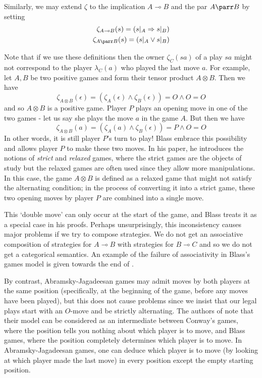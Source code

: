 \documentclass[11pt]{article} %
\theoremstyle{plain} %
\theoremstyle{definition} %
\theoremstyle{exercisestyle}
\newcommand{\tensor}{\otimes}
\renewcommand{\implies}{\multimap}
\newcommand{\emptyplay}{\epsilon}
\begin{document}
Similarly, we may extend $\zeta$ to the implication $A\implies B$ and the par $A\parr B$ by setting
\begin{align*}
  \zeta_{A\implies B}(s)=(s\vert_A\Rightarrow s\vert_B)\\
  \zeta_{A\parr B}(s) = (s\vert_A \vee s\vert_B)
\end{align*}

Note that if we use these definitions then the owner $\zeta_C(sa)$ of a play $sa$ might not correspond to the player $\lambda_C(a)$ who played the last move $a$.  For example, let $A,B$ be two positive games and form their tensor product $A\tensor B$.  Then we have
\[
  \zeta_{A\tensor B}(\emptyplay) = (\zeta_A(\emptyplay) \wedge \zeta_B(\emptyplay)) = O \wedge O = O
  \]
and so $A\tensor B$ is a positive game.  Player $P$ plays an opening move in one of the two games - let us say she plays the move $a$ in the game $A$.  But then we have
\[
  \zeta_{A\tensor B}(a) = (\zeta_A(a) \wedge \zeta_B(\emptyplay)) = P \wedge O = O
  \]
In other words, it is still player $P$'s turn to play!  Blass embrace this possibility and allows player $P$ to make these two moves.  In his paper, he introduces the notions of \emph{strict} and \emph{relaxed} games, where the strict games are the objects of study but the relaxed games are often used since they allow more manipulations.  In this case, the game $A\tensor B$ is defined as a relaxed game that might not satisfy the alternating condition; in the process of converting it into a strict game, these two opening moves by player $P$ are combined into a single move.

This `double move' can only occur at the start of the game, and Blass treats it as a special case in his proofs.  Perhaps unsurprisingly, this inconsistency causes major problems if we try to compose strategies.  We do not get an associative composition of strategies for $A\implies B$ with strategies for $B\implies C$ and so we do not get a categorical semantics.  An example of the failure of associativity in Blass's games model is given towards the end of \cite{abramskyjagadeesangames}.

By contrast, Abramsky-Jagadeesan games may admit moves by both players at the same position (specifically, at the beginning of the game, before any moves have been played), but this does not cause problems since we insist that our legal plays start with an $O$-move and be strictly alternating.  The authors of \cite{abramskyjagadeesangames} note that their model can be considered as an intermediate between Conway's games, where the position tells you nothing about which player is to move, and Blass games, where the position completely determines which player is to move.  In Abramsky-Jagadeesan games, one can deduce which player is to move (by looking at which player made the last move) in every position except the empty starting position.
\end{document}
